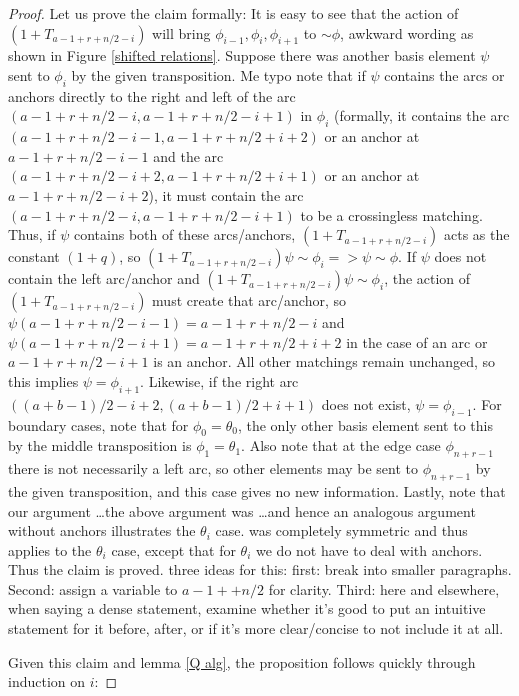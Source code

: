\documentclass{amsart}
\begin{document}
\begin{proof}
	Let us prove the claim formally: It is easy to see that the action of $(1+T_{a-1+r+n/2-i})$ will bring $\phi_{i-1},\phi_i,\phi_{i+1}$ to $\sim \phi$,
  {\color{magenta} awkward wording}
  as shown in 
  {\color{magenta} Figure} 
  \ref{shifted relations}. Suppose there was another basis element $\psi$ sent to $\phi_i$ by the given transposition. Me
  {\color{magenta} typo} 
  note that if $\psi$ contains the arcs or anchors directly to the right and left of the arc $(a-1+r+n/2-i,a-1+r+n/2-i+1)$ in $\phi_i$ (formally, it contains the arc $(a-1+r+n/2-i-1,a-1+r+n/2+i+2)$ or an anchor at $a-1+r+n/2-i-1$ and the arc $(a-1+r+n/2-i+2,a-1+r+n/2+i+1)$ or an anchor at $a-1+r+n/2-i+2$), it must contain the arc $(a-1+r+n/2-i,a-1+r+n/2-i+1)$ to be a crossingless matching. Thus, if $\psi$ contains both of these arcs/anchors, $(1+T_{a-1+r+n/2-i})$ acts as the constant $(1+q)$, so $(1+T_{a-1+r+n/2-i})\psi\sim \phi_i=>\psi\sim \phi$. If $\psi$ does not contain the left arc/anchor and $(1+T_{a-1+r+n/2-i})\psi\sim \phi_i$, the action of $(1+T_{a-1+r+n/2-i})$ must create that arc/anchor, so $\psi(a-1+r+n/2-i-1)=a-1+r+n/2-i$ and $\psi(a-1+r+n/2-i+1)=a-1+r+n/2+i+2$ in the case of an arc or $a-1+r+n/2-i+1$ is an anchor. All other matchings remain unchanged, so this implies $\psi=\phi_{i+1}$. Likewise, if the right arc $((a+b-1)/2-i+2,(a+b-1)/2+i+1)$ does not exist, $\psi=\phi_{i-1}$. For boundary cases, note that for $\phi_0=\theta_0$, the only other basis element sent to this by the middle transposition is $\phi_1=\theta_1$. Also note that at the edge case $\phi_{n+r-1}$ there is not necessarily a left arc, so other elements may be sent to $\phi_{n+r-1}$ by the given transposition, and this case gives no new information. Lastly, note that our argument 
  {\color{magenta} \ldots the above argument was \ldots and hence an analogous argument without anchors illustrates the $\theta_i$ case.}
  was completely symmetric and thus applies to the $\theta_i$ case, except that for $\theta_i$ we do not have to deal with anchors. Thus the claim is proved.
	  {\color{magenta} three ideas for this:
    first: break into smaller paragraphs.
    Second: assign a variable to $a - 1 +  + n/2$ for clarity.
    Third: here and elsewhere, when saying a dense statement, examine whether it's good to put an intuitive statement for it before, after, or if it's more clear/concise to not include it at all.
  }

  Given this claim and lemma \ref{Q alg}, the proposition follows quickly through induction
  {\color{magenta} on $i$}: 
	

\end{proof}
\end{document}
